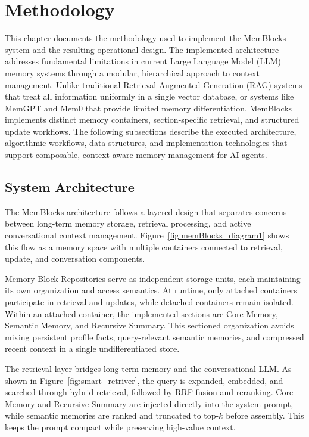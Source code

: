 \documentclass[12pt,a4paper]{article}
\begin{document}
\section{Methodology}

This chapter documents the methodology used to implement the MemBlocks system and the resulting operational design. The implemented architecture addresses fundamental limitations in current Large Language Model (LLM) memory systems through a modular, hierarchical approach to context management. Unlike traditional Retrieval-Augmented Generation (RAG) systems that treat all information uniformly in a single vector database, or systems like MemGPT and Mem0 that provide limited memory differentiation, MemBlocks implements distinct memory containers, section-specific retrieval, and structured update workflows. The following subsections describe the executed architecture, algorithmic workflows, data structures, and implementation technologies that support composable, context-aware memory management for AI agents.

\subsection{System Architecture}

The MemBlocks architecture follows a layered design that separates concerns between long-term memory storage, retrieval processing, and active conversational context management. Figure~\ref{fig:memBlocks_diagram1} shows this flow as a memory space with multiple containers connected to retrieval, update, and conversation components.

Memory Block Repositories serve as independent storage units, each maintaining its own organization and access semantics. At runtime, only attached containers participate in retrieval and updates, while detached containers remain isolated. Within an attached container, the implemented sections are Core Memory, Semantic Memory, and Recursive Summary. This sectioned organization avoids mixing persistent profile facts, query-relevant semantic memories, and compressed recent context in a single undifferentiated store.

The retrieval layer bridges long-term memory and the conversational LLM. As shown in Figure~\ref{fig:smart_retriver}, the query is expanded, embedded, and searched through hybrid retrieval, followed by RRF fusion and reranking. Core Memory and Recursive Summary are injected directly into the system prompt, while semantic memories are ranked and truncated to top-$k$ before assembly. This keeps the prompt compact while preserving high-value context.
\end{document}
